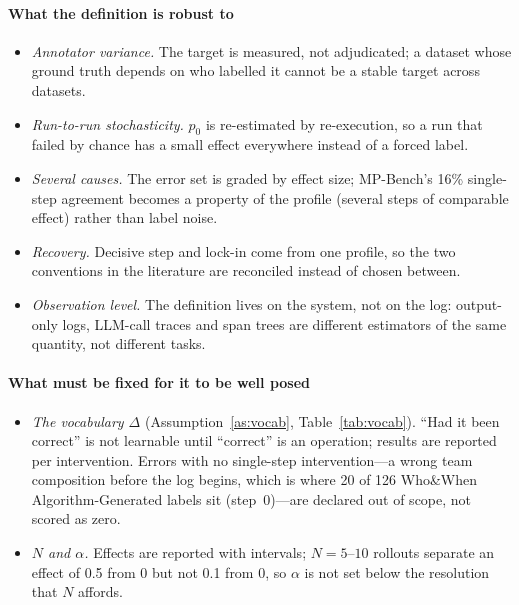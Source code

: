 \paragraph{What the definition is robust to}
\begin{itemize}[leftmargin=1.1em]
\item \emph{Annotator variance.} The target is measured, not adjudicated; a dataset whose ground truth depends on who labelled it cannot be a stable target across datasets.
\item \emph{Run-to-run stochasticity.} $p_0$ is re-estimated by re-execution, so a run that failed by chance has a small effect everywhere instead of a forced label.
\item \emph{Several causes.} The error set is graded by effect size; MP-Bench's 16\% single-step agreement becomes a property of the profile (several steps of comparable effect) rather than label noise.
\item \emph{Recovery.} Decisive step and lock-in come from one profile, so the two conventions in the literature are reconciled instead of chosen between.
\item \emph{Observation level.} The definition lives on the system, not on the log: output-only logs, LLM-call traces and span trees are different estimators of the same quantity, not different tasks.
\end{itemize}

\paragraph{What must be fixed for it to be well posed}
\begin{itemize}[leftmargin=1.1em]
\item \emph{The vocabulary $\Delta$} (Assumption~\ref{as:vocab}, Table~\ref{tab:vocab}). ``Had it been correct'' is not learnable until ``correct'' is an operation; results are reported per intervention. Errors with no single-step intervention---a wrong team composition before the log begins, which is where 20 of 126 Who\&When Algorithm-Generated labels sit (step~0)---are declared out of scope, not scored as zero.
\item \emph{$N$ and $\alpha$.} Effects are reported with intervals; $N=5$--$10$ rollouts separate an effect of 0.5 from 0 but not 0.1 from 0, so $\alpha$ is not set below the resolution that $N$ affords.
\end{itemize}

